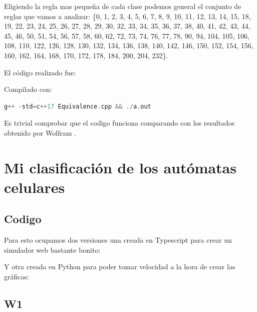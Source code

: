 \documentclass[12pt, fleqn]{report}                             %
\theoremstyle{break}                                            %
\begin{document}
      Eligiendo la regla mas pequeña de cada clase podemos general el conjunto de reglas que vamos a
      analizar: \{0, 1, 2, 3, 4, 5, 6, 7, 8, 9, 10, 11, 12, 13, 14, 15, 18, 19, 22, 23, 24, 25, 26, 27, 28, 29, 
      30, 32, 33, 34, 35, 36, 37, 38, 40, 41, 42, 43, 44, 45, 46, 50, 51, 54, 56, 57, 58, 60, 62, 72, 73, 
      74, 76, 77, 78, 90, 94, 104, 105, 106, 108, 110, 122, 126, 128, 130, 132, 134, 136, 138, 140, 142, 
      146, 150, 152, 154, 156, 160, 162, 164, 168, 170, 172, 178, 184, 200, 204, 232\}.

      El código realizado fue:
      

      Compilado con:
      \begin{lstlisting}[language=C++, gobble=6]
        g++ -std=c++17 Equivalence.cpp && ./a.out
      \end{lstlisting}

      Es trivial comprobar que el codigo funciona comparando con los resultados
      obtenido por Wolfram \cite{Wolfram}.

  \chapter{Mi clasificación de los autómatas celulares}
      \section{Codigo}

        Para esto ocupamos dos versiones una creada en Typescript para crear un simulador
        web bastante bonito:
        

        Y otra creada en Python para poder tomar velocidad a la hora de crear las gráficas:
        

      \clearpage


      \clearpage
      \section{W1}

          

            
\end{document}
